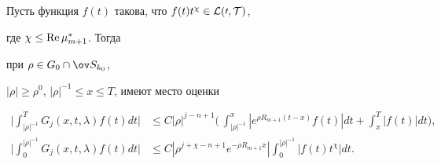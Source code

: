 \begin{lem}


Пусть функция $f(t)$ такова, что $f(t)t^\chi\in\cal L(0,T)$,


где $\chi\le\operatorname{Re}\mu^*_{m+1}$. Тогда


при $\rho\in G_0\cap\ov S_{k_0}$,


$|\rho|\ge\rho^0$, $|\rho|^{-1}\le x\le T$, имеют место оценки


\begin{align}


\biggl|\int^T_{|\rho|^{-1}}G_j(x,t,\lambda)f(t)dt\biggr|&\le


C|\rho|^{j-n+1}\biggl(\,\int^x_{|\rho|^{-1}}


|e^{\rho R_{m+1}(t-x)}f(t)|dt+\int^T_x |f(t)|dt\biggr),\\


\biggl|\int^{|\rho|^{-1}}_0 G_j(x,t,\lambda)f(t)dt\biggr|&\le


C|\rho^{j+\chi-n+1}e^{-\rho R_{m+1}x}|


\int^{|\rho|^{-1}}_0|f(t)t^\chi|dt.


\end{align}


\end{lem}





